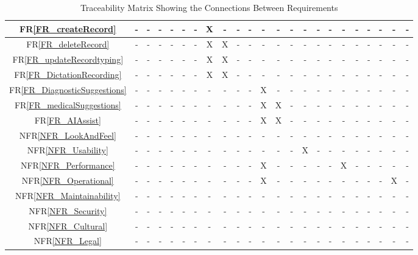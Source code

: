 \documentclass[12pt]{article}
\begin{document}
\begin{table}[H]
\begin{tabular}{|c|c|c|c|c|c|c|c|c|c|c|c|c|c|c|c|c|c|c|c|c|c|c|}
      FR\ref{FR_createRecord} & - & - & - & - & - & - & X & - & - & - & - & - & - & - & - & - & - & - & - & - & - & - \\ \hline
      FR\ref{FR_deleteRecord} & - & - & - & - & - & - & X & X & - & - & - & - & - & - & - & - & - & - & - & - & - & - \\ \hline
      FR\ref{FR_updateRecordtyping} & - & - & - & - & - & - & X & X &  - & - & - & - & - & - & - & - & - & - & - & - & - & - \\ \hline
      FR\ref{FR_DictationRecording} & - & - & - & - & - & - & X & X & - & - & - & - & - & - & - & - & - & - & - & - & - & - \\ \hline
      FR\ref{FR_DiagnosticSuggestions} & - & - & - & - & - & - & - & - & - & - & X & - & - & - & - & - & - & - & - & - & - & - \\ \hline
      FR\ref{FR_medicalSuggestions} & - & - & - & - & - & - & - & - & - & - & X & X & - & - & - & - & - & - & - & - & - & - \\ \hline
      FR\ref{FR_AIAssist} & - & - & - & - & - & - & - & - & - & - & X & X & - & - & - & - & - & - & - & - & - & - \\ \hline
      NFR\ref{NFR_LookAndFeel} & - & - & - & - & - & - & - & - & - & - & - & - & -  & - & - & - & - & - & - & - & - & - \\ \hline
      NFR\ref{NFR_Usability} & - & - & - & - & - & - & - & - & - & - & - & - & - & X & - & - & - & - & - & - & - & - \\ \hline
      NFR\ref{NFR_Performance} & - & - & - & - & - & - & - & - & - & - & X & - & - & - & - & - & X & - & - & - & - & - \\ \hline
      NFR\ref{NFR_Operational} & - & - & - & - & - & - & - & - & - & - & X & -  & - & - & - & - & - & - & - & - & X & - \\ \hline
      NFR\ref{NFR_Maintainability} & - & - & - & - & - & - & - & - & - & - & - & - & - & - & - & - & - & - & - & - & - & - \\ \hline
      NFR\ref{NFR_Security} & - & - & - & - & - & - & - & - & - & - & - & - & - & - & - & - & - & - & - & - & - & - \\ \hline
      NFR\ref{NFR_Cultural} & - & - & - & - & - & - & - & - & - & - & - & - & - & - & - & - & - & - & - & - & - & - \\ \hline
      NFR\ref{NFR_Legal} & - & - & - & - & - & - & - & - & - & - & - & - & - & - & - & - & - & - & - & - & - & - \\ \hline
      \end{tabular}
      \caption{Traceability Matrix Showing the Connections Between Requirements}
      \label{Table:A_trace}
      \end{table}
\end{document}
